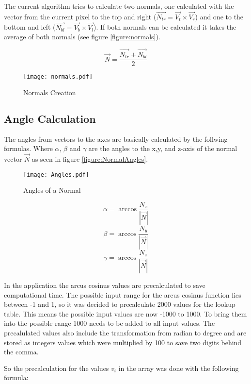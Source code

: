 The current algorithm tries to calculate two normals, one calculated with the vector from the current pixel to the top and right 
($\vec{N_{tr}}=\vec{V_t}\times\vec{V_r}$) and one to
the bottom and left ($\vec{N_{bl}}=\vec{V_b}\times\vec{V_l}$). 
If both normals can be calculated it takes the average of both normals (see figure \vref{figure:normals}).

$$ \vec{N} = \frac{\vec{N_{tr}} + \vec{N_{bl}}}{2}$$

\begin{figure}[htp]
\begin{center}
  \texttt{[image: normals.pdf]}
  \caption{Normals Creation}
  \label{figure:normals}
\end{center}
\end{figure}

\subsection{Angle Calculation}

The angles from vectors to the axes are basically calculated by the follwing formulas. Where $\alpha$, $\beta$ and $\gamma$ 
are the angles to the x,y, and z-axis of the normal vector $\vec{N}$ as seen in figure \vref{figure:NormalAngles}.

\begin{figure}[htp]
\begin{center}
  \texttt{[image: Angles.pdf]}
  \caption{Angles of a Normal}
  \label{figure:NormalAngles}
\end{center} 
\end{figure}

$$ \alpha = \arccos \frac{N_x}{\left|\vec{N}\right|}  $$
$$ \beta  = \arccos \frac{N_y}{\left|\vec{N}\right|}  $$
$$ \gamma = \arccos \frac{N_z}{\left|\vec{N}\right|}  $$

In the application the arcus cosinus values are precalculated to save computational time.
The possible input range for the arcus cosinus function lies between -1 and 1, so it was decided
to precalculate 2000 values for the lookup table. This means the possible input values are now
-1000 to 1000. To bring them into the possible range 1000 needs to be added to all input values.
The precalulated values also include the transformation from radian to degree and are stored as 
integers values which were multiplied by 100 to save two digits behind the comma.

So the precalculation for the values $v_i$ in the array was done with the following formula:

